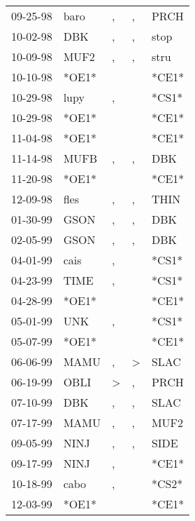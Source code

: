 \begin{supertabular}{lllll}
 09-25-98 &   baro &             , &             , &   PRCH \\
 10-02-98 &    DBK &             , &             , &   stop \\
 10-09-98 &   MUF2 &             , &             , &   stru \\
 10-10-98 &  *OE1* &               &               &  *CE1* \\
 10-29-98 &   lupy &             , &               &  *CS1* \\
 10-29-98 &  *OE1* &               &               &  *CE1* \\
 11-04-98 &  *OE1* &               &               &  *CE1* \\
 11-14-98 &   MUFB &             , &             , &    DBK \\
 11-20-98 &  *OE1* &               &               &  *CE1* \\
 12-09-98 &   fles &             , &             , &   THIN \\
 01-30-99 &   GSON &             , &             , &    DBK \\
 02-05-99 &   GSON &             , &             , &    DBK \\
 04-01-99 &   cais &             , &               &  *CS1* \\
 04-23-99 &   TIME &             , &               &  *CS1* \\
 04-28-99 &  *OE1* &               &               &  *CE1* \\
 05-01-99 &    UNK &             , &               &  *CS1* \\
 05-07-99 &  *OE1* &               &               &  *CE1* \\
 06-06-99 &   MAMU &             , &  \textgreater &   SLAC \\
 06-19-99 &   OBLI &  \textgreater &             , &   PRCH \\
 07-10-99 &    DBK &             , &             , &   SLAC \\
 07-17-99 &   MAMU &             , &             , &   MUF2 \\
 09-05-99 &   NINJ &             , &             , &   SIDE \\
 09-17-99 &   NINJ &             , &               &  *CE1* \\
 10-18-99 &   cabo &             , &               &  *CS2* \\
 12-03-99 &  *OE1* &               &               &  *CE1* \\

\end{supertabular}

